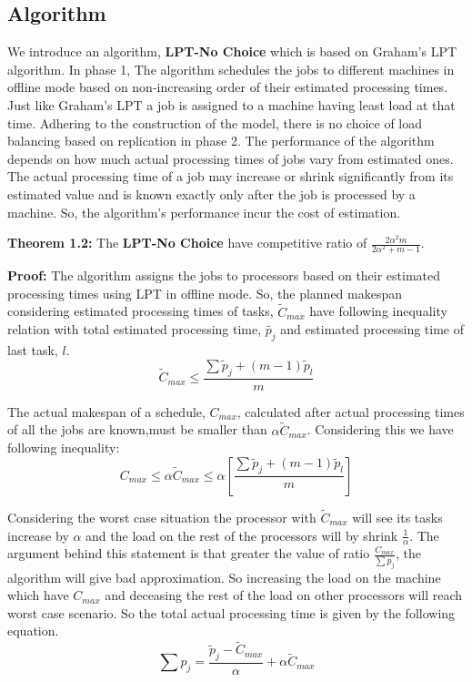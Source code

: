 \documentclass[10pt, conference, compsocconf]{IEEEtran}
\begin{document}
 
 
\subsection{Algorithm}

We introduce an algorithm, \textbf{LPT-No Choice} which
is based on Graham's LPT algorithm. In phase 1, The
algorithm schedules the jobs to different machines in
offline mode based on non-increasing order of their
estimated processing times. Just like Graham's LPT a
job is assigned to a machine having least load at that
time. Adhering to the construction of the model, there
is no choice of load balancing based on replication in
phase 2. The performance of the algorithm depends on
how much actual processing times of jobs vary from
estimated ones. The actual processing time of a job may
increase or shrink significantly from its estimated value
and is known exactly only after the job is processed by
a machine. So, the algorithm's performance incur the
cost of estimation.

\textbf{Theorem 1.2:} The \textbf{LPT-No Choice} have competitive
ratio of $ \frac{2\alpha^{2}m}{2\alpha^{2}+ m-1}$.

\textbf{Proof:} The algorithm assigns the jobs to processors
based on their estimated processing times using LPT in
offline mode. So, the planned makespan considering estimated
processing times of tasks, $\tilde{C}_{max}$ have following
inequality relation with total estimated processing time,
$\tilde{p_j}$ and estimated processing time of last task, $l$. 
\begin{equation}
\tilde C_{max}\leq  \frac{\sum{\tilde p_j + (m-1) \tilde p_l} }{m}
\end{equation}

The actual makespan of a schedule, $C_{max}$, calculated after actual processing times of all the jobs are known,must be smaller than $\alpha\tilde C_{max}$. Considering this we have following inequality:
\begin{equation}
 C_{max}\leq \alpha \tilde C_{max}\leq \alpha [\frac{\sum{\tilde p_j + (m-1) \tilde p_l} }{m}] 
\end{equation} 

Considering the worst case situation the processor with $\tilde C_{max}$ will see its tasks increase by $\alpha$  and the load on the  rest of the processors will by shrink  $\frac{1}{\alpha}$.  The argument behind this statement is that greater the value of ratio $\frac{C_{max}}{\sum{p_j}}$, the algorithm will give bad approximation. So increasing the load on the machine which have $C_{max} $ and deceasing the rest of the load on other processors will reach worst case scenario. So the total actual processing time is given by the  following equation.
 \begin{equation}
 \sum {p_j} = \frac{\tilde p_j- \tilde C_{max}}{\alpha} + \alpha \tilde C_{max}
 \end{equation}
 
\end{document}
